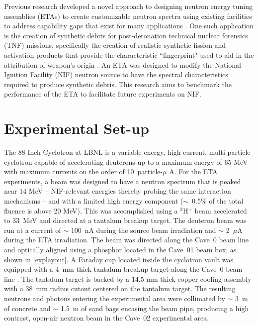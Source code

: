 \documentclass[twocolumn,10pt,final]{asme2ej}
\begin{document}
Previous research developed a novel approach to designing neutron energy tuning assemblies (ETAs) to create customizable neutron spectra using existing facilities to address capability gaps that exist for many applications \cite{Bevins2017}.  
One such application is the creation of synthetic debris for post-detonation technical nuclear forensics (TNF) missions, specifically the creation of realistic synthetic fission and activation products that provide the characteristic ``fingerprint" used to aid in the attribution of weapon's origin  \cite{111thCongress2010, JNFWG2013}.
An ETA was designed to modify the National Ignition Facility (NIF) neutron source to have the spectral characteristics required to produce synthetic debris.
This research aims to benchmark the performance of the ETA to facilitate future experiments on NIF.  


\vspace{-0.4 cm}
\section{Experimental Set-up} \label{sec:exp-setup}
The 88-Inch Cyclotron at LBNL is a variable energy, high-current, multi-particle cyclotron capable of accelerating deuterons up to a maximum energy of 65 MeV with maximum currents on the order of 10~particle-$\mu$ A. 
For the ETA experiments, a beam was designed to have a neutron spectrum that is peaked near 14 MeV -- NIF-relevant energies thereby probing the same interaction mechanisms -- and with a limited high energy component ($\sim$~0.5\% of the total fluence is above 20 MeV).
This was accomplished using a $^2$H$^+$ beam accelerated to 33~MeV and directed at a tantalum breakup target.
The deuteron beam was run at a current of $\sim$ 100~nA during the source beam  irradiation and $\sim$ 2~$\mu$A during the ETA irradiation. 
The beam was directed along the Cave~0 beam line and optically aligned using a phosphor located in the Cave~01 beam box, as shown in \autoref{explayout}. 
A Faraday cup located inside the cyclotron vault was equipped with a 4~mm thick tantalum breakup target along the Cave~0 beam line \cite{Bleuel2007}. 
The tantalum target is backed by a 14.5 mm thick copper cooling assembly with a 38~mm radius cutout centered on the tantalum target. 
The resulting neutrons and photons entering the experimental area were collimated by $\sim$ 3~m of concrete and $\sim$ 1.5~m of sand bags encasing the beam pipe, producing a high contrast, open-air neutron beam in the Cave~02 experimental area.
\end{document}
